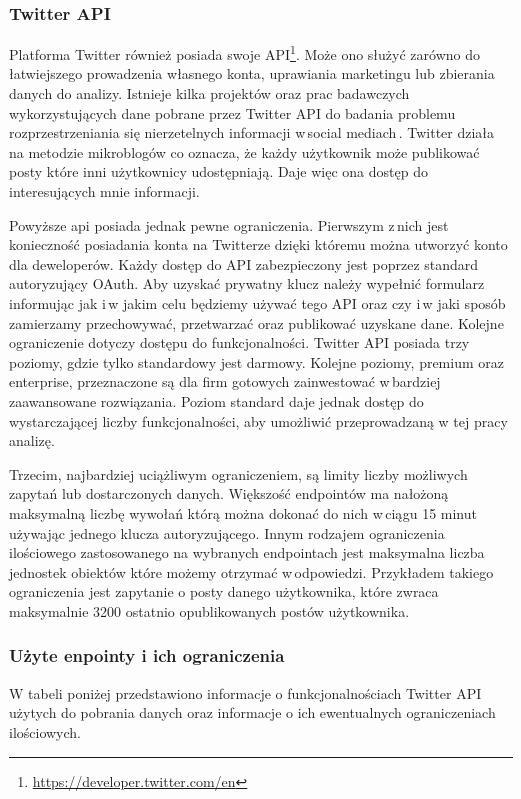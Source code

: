 \subsubsection{Twitter API}
Platforma Twitter również posiada swoje API\footnote{\url{https://developer.twitter.com/en}}. Może ono służyć zarówno do łatwiejszego prowadzenia własnego konta, uprawiania marketingu lub zbierania danych do analizy. Istnieje kilka projektów oraz prac badawczych wykorzystujących dane pobrane przez Twitter API do badania problemu rozprzestrzeniania się nierzetelnych informacji w\,social mediach\,\cite{marchal2019junk}\cite{gorwa2017computational}\cite{vosoughi2018spread}. Twitter działa na metodzie mikroblogów co oznacza, że każdy użytkownik może publikować posty które inni użytkownicy udostępniają. Daje więc ona dostęp do interesujących mnie informacji.
\par
Powyższe api posiada jednak pewne ograniczenia. Pierwszym z\,nich jest konieczność posiadania konta na Twitterze dzięki któremu można utworzyć konto dla deweloperów. Każdy dostęp do API zabezpieczony jest poprzez standard autoryzujący OAuth. Aby uzyskać prywatny klucz należy wypełnić formularz informując jak i\,w jakim celu będziemy używać tego API oraz czy i\,w jaki sposób zamierzamy przechowywać, przetwarzać oraz publikować uzyskane dane.
Kolejne ograniczenie dotyczy dostępu do funkcjonalności. Twitter API posiada trzy poziomy, gdzie tylko standardowy jest darmowy. Kolejne poziomy, premium oraz enterprise, przeznaczone są dla firm gotowych zainwestować w\,bardziej zaawansowane rozwiązania. Poziom standard daje jednak dostęp do wystarczającej liczby funkcjonalności, aby umożliwić przeprowadzaną w tej pracy analizę. 
\par
Trzecim, najbardziej uciążliwym ograniczeniem, są limity liczby możliwych zapytań lub dostarczonych danych. Większość endpointów ma nałożoną maksymalną liczbę wywołań którą można dokonać do nich w\,ciągu 15 minut używając jednego klucza autoryzującego. Innym rodzajem ograniczenia ilościowego zastosowanego na wybranych endpointach jest maksymalna liczba jednostek obiektów które możemy otrzymać w\,odpowiedzi. Przykładem takiego ograniczenia jest zapytanie o posty danego użytkownika, które zwraca maksymalnie 3200 ostatnio opublikowanych postów użytkownika.
\subsubsection{Użyte enpointy i ich ograniczenia}
W tabeli poniżej przedstawiono informacje o funkcjonalnościach Twitter API użytych do pobrania danych oraz informacje o ich ewentualnych ograniczeniach ilościowych.  


